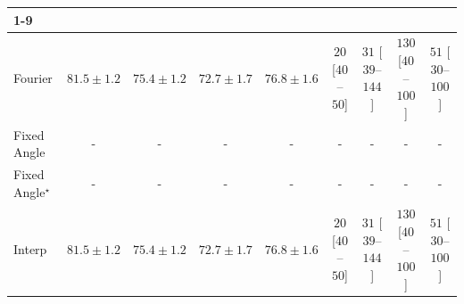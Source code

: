\begin{tabular}{l|cccc|cccc|}
\cline{1-9}
\multicolumn{9}{c}{\rule{0pt}{8pt}PP} \\
\midrule
Fourier & {\cellcolor[HTML]{00512E}} \color[HTML]{F1F1F1} $81.5\pm 1.2$ & {\cellcolor[HTML]{A2D88A}} \color[HTML]{000000} $75.4\pm 1.2$ & {\cellcolor[HTML]{F0F9B4}} \color[HTML]{000000} $72.7\pm 1.7$ & {\cellcolor[HTML]{6DC073}} \color[HTML]{000000} $76.8\pm 1.6$ & {\cellcolor[HTML]{FFF3EF}} \color[HTML]{000000} $20$ [$40$--$50$] & {\cellcolor[HTML]{FEF1ED}} \color[HTML]{000000} $31$ [$39$--$144$] & {\cellcolor[HTML]{FDD8D5}} \color[HTML]{000000} $130$ [$40$--$100$] & {\cellcolor[HTML]{FEECE9}} \color[HTML]{000000} $51$ [$30$--$100$] \\
Fixed Angle & {\cellcolor[HTML]{000000}} \color[HTML]{F1F1F1} {\cellcolor{white}} \color{black} - & {\cellcolor[HTML]{000000}} \color[HTML]{F1F1F1} {\cellcolor{white}} \color{black} - & {\cellcolor[HTML]{000000}} \color[HTML]{F1F1F1} {\cellcolor{white}} \color{black} - & {\cellcolor[HTML]{000000}} \color[HTML]{F1F1F1} {\cellcolor{white}} \color{black} - & {\cellcolor[HTML]{000000}} \color[HTML]{F1F1F1} {\cellcolor{white}} \color{black} - & {\cellcolor[HTML]{000000}} \color[HTML]{F1F1F1} {\cellcolor{white}} \color{black} - & {\cellcolor[HTML]{000000}} \color[HTML]{F1F1F1} {\cellcolor{white}} \color{black} - & {\cellcolor[HTML]{000000}} \color[HTML]{F1F1F1} {\cellcolor{white}} \color{black} - \\
Fixed Angle$^\star$ & {\cellcolor[HTML]{000000}} \color[HTML]{F1F1F1} {\cellcolor{white}} \color{black} - & {\cellcolor[HTML]{000000}} \color[HTML]{F1F1F1} {\cellcolor{white}} \color{black} - & {\cellcolor[HTML]{000000}} \color[HTML]{F1F1F1} {\cellcolor{white}} \color{black} - & {\cellcolor[HTML]{000000}} \color[HTML]{F1F1F1} {\cellcolor{white}} \color{black} - & {\cellcolor[HTML]{000000}} \color[HTML]{F1F1F1} {\cellcolor{white}} \color{black} - & {\cellcolor[HTML]{000000}} \color[HTML]{F1F1F1} {\cellcolor{white}} \color{black} - & {\cellcolor[HTML]{000000}} \color[HTML]{F1F1F1} {\cellcolor{white}} \color{black} - & {\cellcolor[HTML]{000000}} \color[HTML]{F1F1F1} {\cellcolor{white}} \color{black} - \\
Interp & {\cellcolor[HTML]{00512E}} \color[HTML]{F1F1F1} $81.5\pm 1.2$ & {\cellcolor[HTML]{A2D88A}} \color[HTML]{000000} $75.4\pm 1.2$ & {\cellcolor[HTML]{F0F9B4}} \color[HTML]{000000} $72.7\pm 1.7$ & {\cellcolor[HTML]{6DC073}} \color[HTML]{000000} $76.8\pm 1.6$ & {\cellcolor[HTML]{FFF3EF}} \color[HTML]{000000} $20$ [$40$--$50$] & {\cellcolor[HTML]{FEF1ED}} \color[HTML]{000000} $31$ [$39$--$144$] & {\cellcolor[HTML]{FDD8D5}} \color[HTML]{000000} $130$ [$40$--$100$] & {\cellcolor[HTML]{FEECE9}} \color[HTML]{000000} $51$ [$30$--$100$] \\

\end{tabular}
